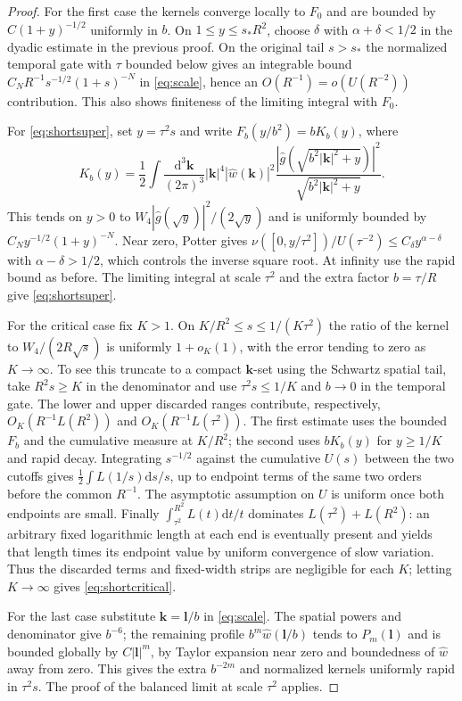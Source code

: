 \documentclass[11pt]{article}
\theoremstyle{remark}
\newcommand{\dd}{\mathrm d}
\begin{document}
\begin{proof}
For the first case the kernels converge locally to \(F_0\)
and are bounded by \(C(1+y)^{-1/2}\) uniformly in \(b\).
On \(1\le y\le s_*R^2\), choose \(\delta\) with
\(\alpha+\delta<1/2\) in the dyadic estimate in the previous
proof. On the original tail \(s>s_*\) the normalized temporal
gate with \(\tau\) bounded below gives an integrable bound
\(C_NR^{-1}s^{-1/2}(1+s)^{-N}\) in \eqref{eq:scale},
hence an \(O(R^{-1})=o(U(R^{-2}))\) contribution. This also
shows finiteness of the limiting integral with \(F_0\).

For \eqref{eq:shortsuper}, set \(y=\tau^2s\) and write
\(F_b(y/b^2)=bK_b(y)\), where
\[
 K_b(y)=\frac12\int\frac{\dd^3\mathbf k}{(2\pi)^3}
 |\mathbf k|^4|\widehat w(\mathbf k)|^2
 \frac{|\widehat g(\sqrt{b^2|\mathbf k|^2+y})|^2}
            {\sqrt{b^2|\mathbf k|^2+y}}.
\]
This tends on \(y>0\) to \(W_4|\widehat g(\sqrt y)|^2/(2\sqrt y)\)
and is uniformly bounded by \(C_N y^{-1/2}(1+y)^{-N}\).
Near zero, Potter gives
\(\nu([0,y/\tau^2])/U(\tau^{-2})\le C_\delta
 y^{\alpha-\delta}\) with \(\alpha-\delta>1/2\), which
controls the inverse square root. At infinity use the rapid
bound as before. The limiting integral at scale \(\tau^2\)
and the extra factor \(b=\tau/R\) give \eqref{eq:shortsuper}.

For the critical case fix \(K>1\). On
\(K/R^2\le s\le 1/(K\tau^2)\) the ratio of the kernel to
\(W_4/(2R\sqrt s)\) is uniformly \(1+o_K(1)\), with the
error tending to zero as \(K\to\infty\). To see this truncate
to a compact \(\mathbf k\)-set using the Schwartz spatial
tail, take \(R^2s\ge K\) in the denominator and use
\(\tau^2s\le1/K\) and \(b\to0\) in the temporal gate.
The lower and upper discarded ranges contribute,
respectively, \(O_K(R^{-1}L(R^2))\) and
\(O_K(R^{-1}L(\tau^2))\).
The first estimate uses the bounded \(F_b\) and the cumulative
measure at \(K/R^2\); the second uses \(bK_b(y)\) for
\(y\ge1/K\) and rapid decay. Integrating \(s^{-1/2}\)
against the cumulative \(U(s)\) between the two cutoffs gives
\(\frac12\int L(1/s)\dd s/s\), up to endpoint terms of the
same two orders before the common \(R^{-1}\).
The asymptotic assumption on \(U\) is uniform once both
endpoints are small. Finally
\(\int_{\tau^2}^{R^2}L(t)\dd t/t\)
dominates \(L(\tau^2)+L(R^2)\): an arbitrary fixed logarithmic
length at each end is eventually present and yields that
length times its endpoint value by uniform convergence of
slow variation. Thus the discarded terms and fixed-width
strips are negligible for each \(K\); letting \(K\to\infty\)
gives \eqref{eq:shortcritical}.

For the last case substitute \(\mathbf k=\boldsymbol l/b\)
in \eqref{eq:scale}. The spatial powers and denominator
give \(b^{-6}\); the remaining profile
\(b^m\widehat w(\boldsymbol l/b)\) tends to \(P_m(\boldsymbol l)\)
and is bounded globally by \(C|\boldsymbol l|^m\), by Taylor
expansion near zero and boundedness of \(\widehat w\) away
from zero. This gives the extra \(b^{-2m}\) and normalized
kernels uniformly rapid in \(\tau^2s\). The proof of the
balanced limit at scale \(\tau^2\) applies.
\end{proof}
\end{document}
